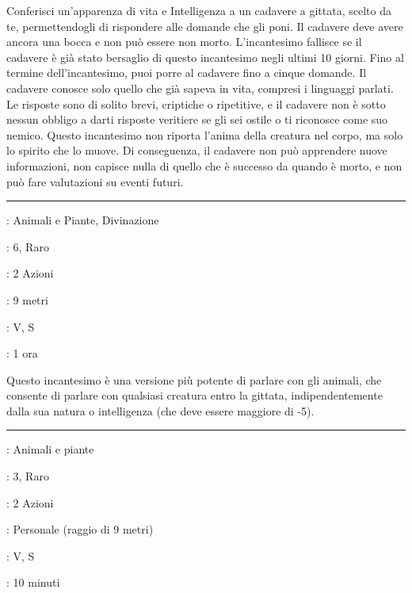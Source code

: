 \begin{multicols}{2}
Conferisci un'apparenza di vita e Intelligenza a un cadavere a gittata, scelto da te, permettendogli di rispondere alle domande che gli poni. Il cadavere deve avere ancora una bocca e non può essere non morto. L'incantesimo fallisce se il cadavere è già stato bersaglio di questo incantesimo negli ultimi 10 giorni. Fino al termine dell'incantesimo, puoi porre al cadavere fino a cinque domande. Il cadavere conosce solo quello che già sapeva in vita, compresi i linguaggi parlati. Le risposte sono di solito brevi, criptiche o ripetitive, e il cadavere non è sotto nessun obbligo a darti risposte veritiere se gli sei ostile o ti riconosce come suo nemico. Questo incantesimo non riporta l'anima della creatura nel corpo, ma solo lo spirito che lo muove. Di conseguenza, il cadavere non può apprendere nuove informazioni, non capisce nulla di quello che è successo da quando è morto, e non può fare valutazioni su eventi futuri.

\smallskip\noindent\rule{\linewidth}{2pt} \hypertarget{Parlare con le Creature}{}\smallskip{}
\noindent
\begin{description}[noitemsep, topsep=0pt, parsep=0pt, partopsep=0pt, leftmargin=0cm, labelwidth=2.8cm]
	\item[\textbf{Lista di Magia}]: Animali e Piante, Divinazione
	\item[\textbf{Livello}]: 6, Raro
	\item[\textbf{T. di Lancio}]: 2 Azioni
	\item[\textbf{Gittata}]: 9 metri
	\item[\textbf{Componenti}]: V, S
	\item[\textbf{Durata}]: 1 ora
\end{description}

Questo incantesimo è una versione più potente di parlare con gli animali, che consente di parlare con qualsiasi creatura entro la gittata, indipendentemente dalla sua natura o intelligenza (che deve essere maggiore di -5).

\smallskip\noindent\rule{\linewidth}{2pt} \hypertarget{Parlare con le Piante}{}\smallskip{}
\noindent
\begin{description}[noitemsep, topsep=0pt, parsep=0pt, partopsep=0pt, leftmargin=0cm, labelwidth=2.8cm]
	\item[\textbf{Lista di Magia}]: Animali e piante
	\item[\textbf{Livello}]: 3, Raro
	\item[\textbf{T. di Lancio}]: 2 Azioni
	\item[\textbf{Gittata}]: Personale (raggio di 9 metri)
	\item[\textbf{Componenti}]: V, S
	\item[\textbf{Durata}]: 10 minuti
\end{description}


\end{multicols}
